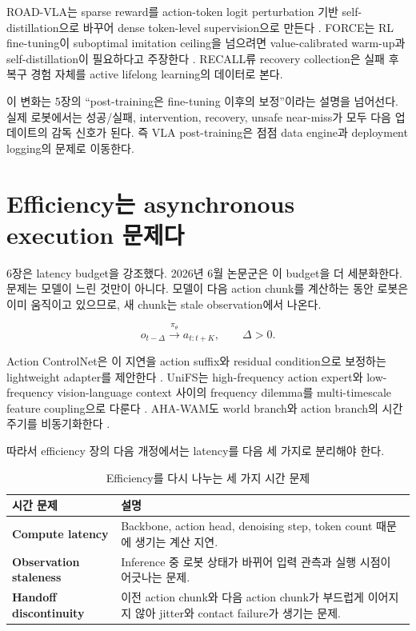 ROAD-VLA는 sparse reward를 action-token logit perturbation 기반 self-distillation으로 바꾸어 dense token-level supervision으로 만든다 \citep{roadvla2026}. FORCE는 RL fine-tuning이 suboptimal imitation ceiling을 넘으려면 value-calibrated warm-up과 self-distillation이 필요하다고 주장한다 \citep{forcevla2026}. RECALL류 recovery collection은 실패 후 복구 경험 자체를 active lifelong learning의 데이터로 본다.

이 변화는 5장의 ``post-training은 fine-tuning 이후의 보정''이라는 설명을 넘어선다. 실제 로봇에서는 성공/실패, intervention, recovery, unsafe near-miss가 모두 다음 업데이트의 감독 신호가 된다. 즉 VLA post-training은 점점 data engine과 deployment logging의 문제로 이동한다.

\section{Efficiency는 asynchronous execution 문제다}

6장은 latency budget을 강조했다. 2026년 6월 논문군은 이 budget을 더 세분화한다. 문제는 모델이 느린 것만이 아니다. 모델이 다음 action chunk를 계산하는 동안 로봇은 이미 움직이고 있으므로, 새 chunk는 stale observation에서 나온다.

\begin{equation}
  o_{t-\Delta}
  \xrightarrow{\pi_\theta}
  a_{t:t+K},
  \qquad
  \Delta > 0.
\end{equation}

Action ControlNet은 이 지연을 action suffix와 residual condition으로 보정하는 lightweight adapter를 제안한다 \citep{actioncontrolnet2026}. UniFS는 high-frequency action expert와 low-frequency vision-language context 사이의 frequency dilemma를 multi-timescale feature coupling으로 다룬다 \citep{unifs2026}. AHA-WAM도 world branch와 action branch의 시간 주기를 비동기화한다 \citep{ahawam2026}.

따라서 efficiency 장의 다음 개정에서는 latency를 다음 세 가지로 분리해야 한다.

\begin{table}[t]
  \centering
  \caption{Efficiency를 다시 나누는 세 가지 시간 문제}
  \label{tab:june2026_efficiency_split}
  \begin{tabularx}{\textwidth}{>{\bfseries}p{30mm}X}
    \toprule
    시간 문제 & 설명 \\
    \midrule
    Compute latency & Backbone, action head, denoising step, token count 때문에 생기는 계산 지연. \\
    Observation staleness & Inference 중 로봇 상태가 바뀌어 입력 관측과 실행 시점이 어긋나는 문제. \\
    Handoff discontinuity & 이전 action chunk와 다음 action chunk가 부드럽게 이어지지 않아 jitter와 contact failure가 생기는 문제. \\
    \bottomrule
  \end{tabularx}
\end{table}

